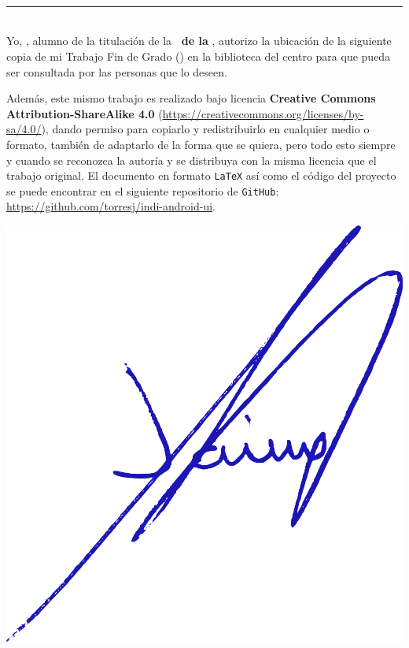 \begin{center}
{\LARGE\bfseries\titulo}\\
\end{center}
\begin{center}
\autor\
\end{center}

\newpage
\thispagestyle{empty}
\
\vspace{3cm}

\noindent\rule[-1ex]{\textwidth}{2pt}\\[4.5ex]

Yo, \textbf{\autor}, alumno de la titulación \textbf{\grado} de la \textbf{\escuela\ de la \universidad}, autorizo la ubicación de la siguiente copia de mi Trabajo Fin de Grado (\textit{\titulo}) en la biblioteca del centro para que pueda ser consultada por las personas que lo deseen.

\bigskip
Además, este mismo trabajo es realizado bajo licencia \textbf{Creative Commons Attribution-ShareAlike 4.0} (\url{https://creativecommons.org/licenses/by-sa/4.0/}), dando permiso para copiarlo y redistribuirlo en cualquier medio o formato, también de adaptarlo de la forma que se quiera, pero todo esto siempre y cuando se reconozca la autoría y se distribuya con la misma licencia que el trabajo original. El documento en formato {\tt LaTeX} así como el código del proyecto se puede encontrar en el siguiente repositorio de {\tt GitHub}: \url{https://github.com/torresj/indi-android-ui}.

\vspace{1cm}
\includegraphics[scale=0.1]{../images/firmaJaimeBuena.png}

